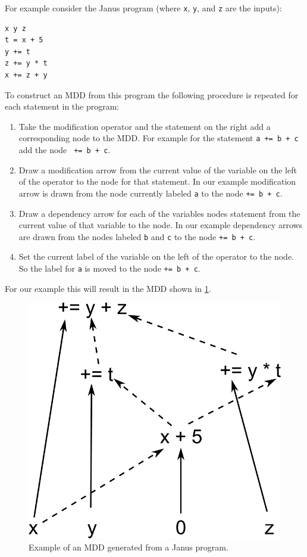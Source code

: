 
For example consider the Janus program (where \verb|x|, \verb|y|, and \verb|z|
are the inputs):

\begin{verbatim}
x y z
t = x + 5
y += t
z += y * t
x += z + y
\end{verbatim}

To construct an MDD from this program the following procedure is repeated for
each statement in the program:

\begin{enumerate}

    \item Take the modification operator and the statement on the right add a
        corresponding node to the MDD. For example for the statement \verb|a += b + c|
        add the node \verb| += b + c|.

    \item Draw a modification arrow from the current value of the variable on
        the left of the operator to the node for that statement. In our example
        modification arrow is drawn from the node currently labeled \verb|a| to
        the node \verb|+= b + c|.

    \item Draw a dependency arrow for each of the variables nodes statement
        from the current value of that variable to the node. In our example
        dependency arrows are drawn from the nodes labeled \verb|b| and
        \verb|c| to the node \verb|+= b + c|.

    \item Set the current label of the variable on the left of the operator to
        the node. So the label for \verb|a| is moved to the node \verb|+= b + c|.

\end{enumerate}

For our example this will result in the MDD shown in \cref{fig:janus-mdd}.

\begin{figure}
      \capstart
      \centering
      \includegraphics[width=0.4\hsize]{images/janus-mdd}

      \caption{Example of an MDD generated from a Janus program.}

      \label{fig:janus-mdd}
\end{figure}

